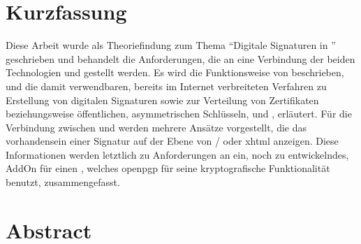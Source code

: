 

\noindent
\begin{minipage}{\textwidth}
\chapter*{Kurzfassung}
Diese Arbeit wurde als Theoriefindung zum Thema ``Digitale Signaturen in '' geschrieben und behandelt die Anforderungen, die an eine Verbindung
der beiden Technologien  und  gestellt werden. Es wird die Funktionsweise von  beschrieben, und die damit
verwendbaren, bereits im Internet verbreiteten Verfahren zu Erstellung von digitalen Signaturen sowie zur Verteilung von Zertifikaten beziehungsweise
öffentlichen, asymmetrischen Schlüsseln,  und , erläutert. Für die Verbindung zwischen  und
 werden mehrere Ansätze vorgestellt, die das vorhandensein einer Signatur auf der Ebene von / oder \gls{xhtml}
anzeigen. Diese Informationen werden letztlich zu Anforderungen an ein, noch zu entwickelndes, AddOn für einen , welches \gls{openpgp} für
seine kryptografische Funktionalität benutzt, zusammengefasst.

\chapter*{Abstract}
\blindtext

\end{minipage}
